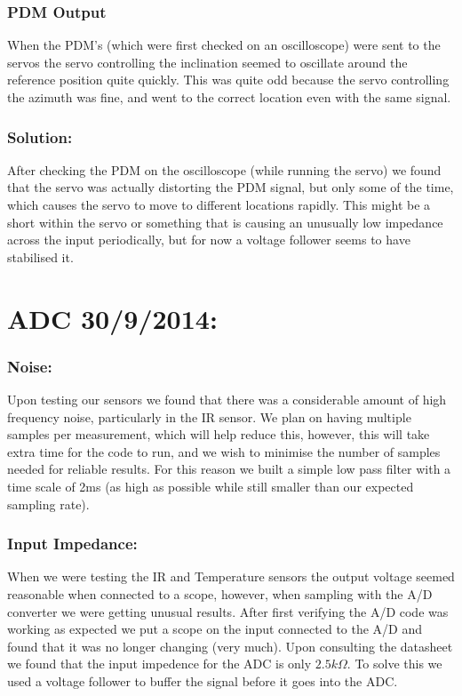 \documentclass[]{article}
\begin{document}
\subsubsection{PDM Output}
When the PDM's (which were first checked on an oscilloscope) were sent to the servos the servo controlling the inclination seemed to oscillate around the reference position quite quickly. This was quite odd because the servo controlling the azimuth was fine, and went to the correct location even with the same signal.

\subsubsection{Solution:}
After checking the PDM on the oscilloscope (while running the servo) we found that the servo was actually distorting the PDM signal, but only some of the time, which causes the servo to move to different locations rapidly. This might be a short within the servo or something that is causing an unusually low impedance across the input periodically, but for now a voltage follower seems to have stabilised it.

\section{ADC 30/9/2014:}
\subsubsection{Noise:}
Upon testing our sensors we found that there was a considerable amount of high frequency noise, particularly in the IR sensor. We plan on having multiple samples per measurement, which will help reduce this, however, this will take extra time for the code to run, and we wish to minimise the number of samples needed for reliable results. For this reason we built a simple low pass filter with a time scale of 2ms (as high as possible while still smaller than our expected sampling rate).

\subsubsection{Input Impedance:}
When we were testing the IR and Temperature sensors the output voltage seemed reasonable when connected to a scope, however, when sampling with the A/D converter we were getting unusual results. After first verifying the A/D code was working as expected we put a scope on the input connected to the A/D and found that it was no longer changing (very much). Upon consulting the datasheet we found that the input impedence for the ADC is only $2.5k\Omega$. To solve this we used a voltage follower to buffer the signal before it goes into the ADC.
\end{document}
